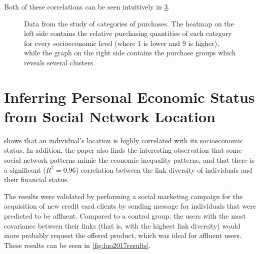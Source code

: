 Both of these correlations can be seen intuitively in \cref{fig:paper_yannick}.

\begin{figure}
\centering
\begin{subfigure}[t]{.45\textwidth}
\label{fig:service_socioeconomic}
\end{subfigure}
\begin{subfigure}[t]{.45\textwidth}
\label{fig:service_service}
\end{subfigure}
\caption{Data from the study of categories of purchases. The heatmap on the left side contains the relative purchasing quantities of each category for every socioeconomic level (where 1 is lower and 9 is higher), while the graph on the right side contains the purchase groups which reveals several clusters.}
\label{fig:paper_yannick}
\end{figure}

\section{Inferring Personal Economic Status from Social Network Location}
\label{sec:luo2017inferring}

\cite{Luo2017inferring} shows that an individual's location is highly correlated with its socioeconomic status.
In addition, the paper also finds the interesting observation that some social network patterns mimic the economic inequality patterns, and that there is a significant ($R^2 = 0.96$) correlation between the link diversity of individuals and their financial status.

The results were validated by performing a social marketing campaign for the acquisition of new credit card clients by sending message for individuals that were predicted to be affluent.
Compared to a control group, the users with the most covariance between their links (that is, with the highest link diversity) would more probably request the offered product, which was ideal for affluent users. These results can be seen in \cref{fig:luo2017results}.

